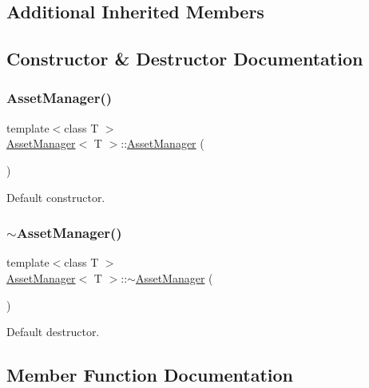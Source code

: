 \subsection*{Additional Inherited Members}


\subsection{Constructor \& Destructor Documentation}
\mbox{\label{class_asset_manager_a17362b22d791f64a200bfeaffa9b5108}} 
\subsubsection{\texorpdfstring{Asset\+Manager()}{AssetManager()}}
{\footnotesize\ttfamily template$<$class T $>$ \\
\mbox{\hyperlink{class_asset_manager}{Asset\+Manager}}$<$ T $>$\+::\mbox{\hyperlink{class_asset_manager}{Asset\+Manager}} (\begin{DoxyParamCaption}{ }\end{DoxyParamCaption})\hspace{0.3cm}{\ttfamily [inline]}}

Default constructor. \mbox{\label{class_asset_manager_a99de467c293ead8517bbfd5672b40b0d}} 
\subsubsection{\texorpdfstring{$\sim$\+Asset\+Manager()}{~AssetManager()}}
{\footnotesize\ttfamily template$<$class T $>$ \\
\mbox{\hyperlink{class_asset_manager}{Asset\+Manager}}$<$ T $>$\+::$\sim$\mbox{\hyperlink{class_asset_manager}{Asset\+Manager}} (\begin{DoxyParamCaption}{ }\end{DoxyParamCaption})\hspace{0.3cm}{\ttfamily [inline]}}

Default destructor. 

\subsection{Member Function Documentation}
\mbox{\label{class_asset_manager_a28d1324d3a691d83e4395661702dc9eb}} 
